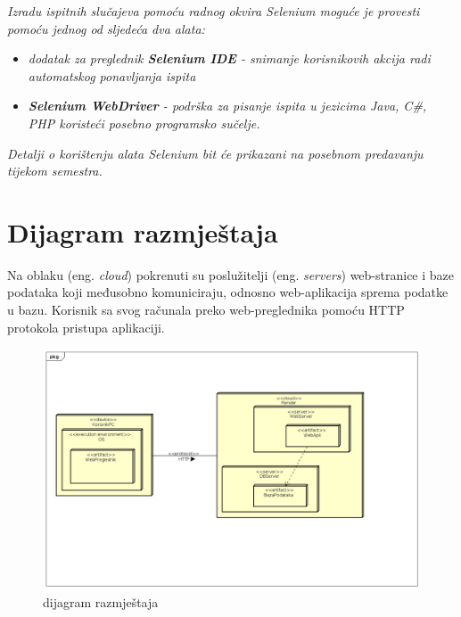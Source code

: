 			 \textit{Izradu ispitnih slučajeva pomoću radnog okvira Selenium moguće je provesti pomoću jednog od sljedeća dva alata:}
			 \begin{itemize}
			 	\item \textit{dodatak za preglednik \textbf{Selenium IDE} - snimanje korisnikovih akcija radi automatskog ponavljanja ispita	}
			 	\item \textit{\textbf{Selenium WebDriver} - podrška za pisanje ispita u jezicima Java, C\#, PHP koristeći posebno programsko sučelje.}
			 \end{itemize}
		 	\textit{Detalji o korištenju alata Selenium bit će prikazani na posebnom predavanju tijekom semestra.}
			
			\eject 
		
		
		\section{Dijagram razmještaja}
			
			
			 Na oblaku (eng. \textit{cloud}) pokrenuti su poslužitelji (eng. \textit{servers}) web-stranice i baze podataka koji međusobno komuniciraju, odnosno web-aplikacija sprema podatke u bazu. Korisnik sa svog računala preko web-preglednika pomoću HTTP protokola pristupa aplikaciji.
			 
			 \begin{figure}[H]
			\includegraphics[width=\textwidth]{slike/dijagramRazmjestaja.png} %
			\caption{dijagram razmještaja}
			\label{fig:dijagramRazmjestaja} %
			\end{figure}
			
